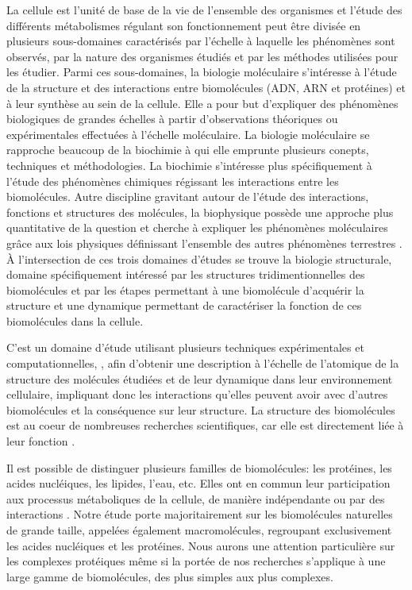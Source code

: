 La cellule est l’unité de base de la vie de l’ensemble des organismes et l'étude des différents métabolismes régulant son fonctionnement peut être divisée en plusieurs sous-domaines caractérisés par l'échelle à laquelle les phénomènes sont observés, par la nature des organismes étudiés et par les méthodes utilisées pour les étudier. Parmi ces sous-domaines, la biologie moléculaire s'intéresse à l'étude de la structure et des interactions entre biomolécules (ADN, ARN et protéines) et à leur synthèse au sein de la cellule. Elle a pour but d'expliquer des phénomènes biologiques de grandes échelles à partir d'observations théoriques ou expérimentales effectuées à l'échelle moléculaire. La biologie moléculaire se rapproche beaucoup de la biochimie à qui elle emprunte plusieurs conepts, techniques et méthodologies. La biochimie s'intéresse plus spécifiquement à l'étude des phénomènes chimiques régissant les interactions entre les biomolécules. Autre discipline gravitant autour de l'étude des interactions, fonctions et structures des molécules, la biophysique possède une approche plus quantitative de la question et cherche à expliquer les phénomènes moléculaires grâce aux lois physiques définissant l’ensemble des autres phénomènes terrestres \style {}. À l'intersection de ces trois domaines d'études se trouve la biologie structurale, domaine spécifiquement intéressé par les structures tridimentionnelles des biomolécules et par les étapes permettant à une biomolécule d'acquérir la structure et une dynamique permettant de caractériser la fonction de ces biomolécules dans la cellule. 

\style  {}
C'est un domaine d'étude utilisant plusieurs techniques expérimentales et computationnelles, , afin d'obtenir une description à l'échelle de l'atomique  de la structure des molécules étudiées et de leur dynamique  dans leur environnement cellulaire, impliquant donc les interactions qu'elles peuvent avoir avec d'autres biomolécules et la conséquence sur leur structure. La structure des biomolécules est au coeur de nombreuses recherches scientifiques, car elle est directement liée à leur fonction \cite{lodish2000molecular}.


Il est possible de distinguer plusieurs familles de biomolécules: les protéines, les acides nucléiques, les lipides, l'eau, etc. Elles ont en commun leur participation aux processus métaboliques de la cellule, de manière indépendante ou par des interactions . Notre étude porte majoritairement sur les biomolécules naturelles de grande taille, appelées également macromolécules, regroupant exclusivement les acides nucléiques et les protéines. Nous aurons une attention particulière sur les complexes protéiques même si la portée de nos recherches s'applique à une large gamme de biomolécules, des plus simples aux plus complexes.


